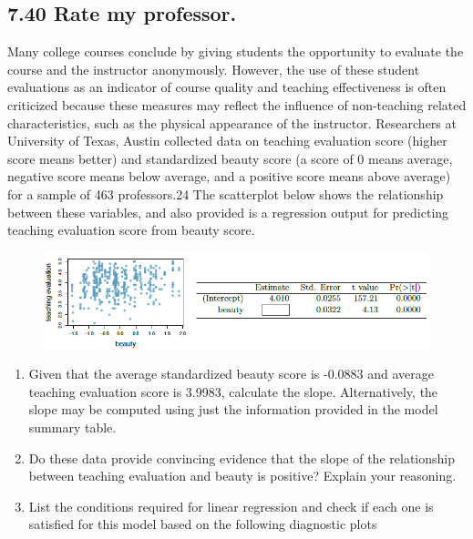 \documentclass[]{article}
\providecommand{\tightlist}{%
  \setlength{\itemsep}{0pt}\setlength{\parskip}{0pt}}
\begin{document}
\subsection{7.40 Rate my professor.}\label{rate-my-professor.}

Many college courses conclude by giving students the opportunity to
evaluate the course and the instructor anonymously. However, the use of
these student evaluations as an indicator of course quality and teaching
effectiveness is often criticized because these measures may reflect the
influence of non-teaching related characteristics, such as the physical
appearance of the instructor. Researchers at University of Texas, Austin
collected data on teaching evaluation score (higher score means better)
and standardized beauty score (a score of 0 means average, negative
score means below average, and a positive score means above average) for
a sample of 463 professors.24 The scatterplot below shows the
relationship between these variables, and also provided is a regression
output for predicting teaching evaluation score from beauty score.

\begin{figure}
\centering
\includegraphics{7.40a.PNG}
\caption{}
\end{figure}

\begin{enumerate}
\def\labelenumi{(\alph{enumi})}
\tightlist
\item
  Given that the average standardized beauty score is -0.0883 and
  average teaching evaluation score is 3.9983, calculate the slope.
  Alternatively, the slope may be computed using just the information
  provided in the model summary table.\\
\item
  Do these data provide convincing evidence that the slope of the
  relationship between teaching evaluation and beauty is positive?
  Explain your reasoning.\\
\item
  List the conditions required for linear regression and check if each
  one is satisfied for this model based on the following diagnostic
  plots
\end{enumerate}
\end{document}
